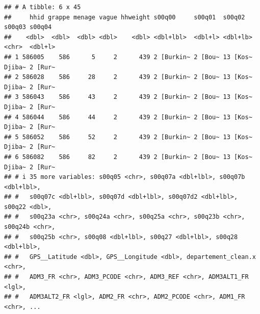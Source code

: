 \documentclass[
]{article}
\begin{document}
\begin{verbatim}
## # A tibble: 6 x 45
##     hhid grappe menage vague hhweight s00q00     s00q01  s00q02   s00q03 s00q04 
##    <dbl>  <dbl>  <dbl> <dbl>    <dbl> <dbl+lbl>  <dbl+l> <dbl+lb> <chr>  <dbl+l>
## 1 586005    586      5     2      439 2 [Burkin~ 2 [Bou~ 13 [Kos~ Djiba~ 2 [Rur~
## 2 586028    586     28     2      439 2 [Burkin~ 2 [Bou~ 13 [Kos~ Djiba~ 2 [Rur~
## 3 586043    586     43     2      439 2 [Burkin~ 2 [Bou~ 13 [Kos~ Djiba~ 2 [Rur~
## 4 586044    586     44     2      439 2 [Burkin~ 2 [Bou~ 13 [Kos~ Djiba~ 2 [Rur~
## 5 586052    586     52     2      439 2 [Burkin~ 2 [Bou~ 13 [Kos~ Djiba~ 2 [Rur~
## 6 586082    586     82     2      439 2 [Burkin~ 2 [Bou~ 13 [Kos~ Djiba~ 2 [Rur~
## # i 35 more variables: s00q05 <chr>, s00q07a <dbl+lbl>, s00q07b <dbl+lbl>,
## #   s00q07c <dbl+lbl>, s00q07d <dbl+lbl>, s00q07d2 <dbl+lbl>, s00q22 <dbl>,
## #   s00q23a <chr>, s00q24a <chr>, s00q25a <chr>, s00q23b <chr>, s00q24b <chr>,
## #   s00q25b <chr>, s00q08 <dbl+lbl>, s00q27 <dbl+lbl>, s00q28 <dbl+lbl>,
## #   GPS__Latitude <dbl>, GPS__Longitude <dbl>, departement_clean.x <chr>,
## #   ADM3_FR <chr>, ADM3_PCODE <chr>, ADM3_REF <chr>, ADM3ALT1_FR <lgl>,
## #   ADM3ALT2_FR <lgl>, ADM2_FR <chr>, ADM2_PCODE <chr>, ADM1_FR <chr>, ...
\end{verbatim}
\end{document}
